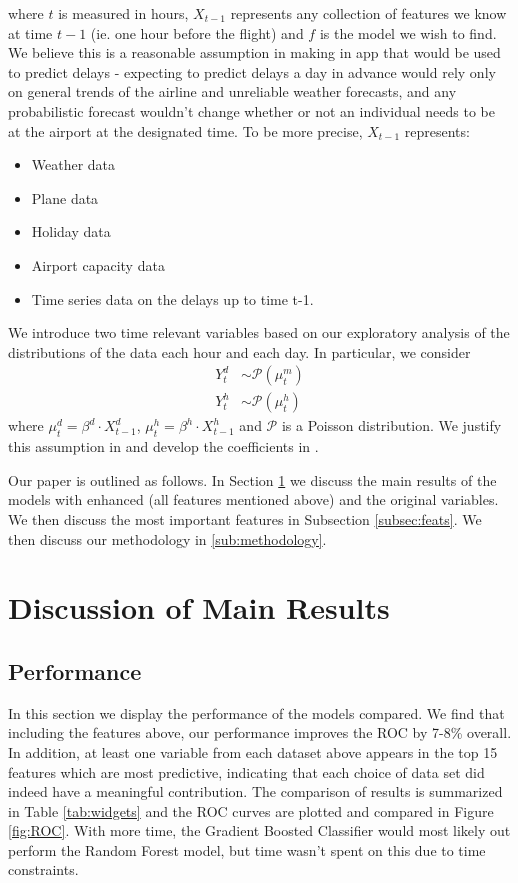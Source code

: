 \documentclass[twocolumn,showpacs,%
  nofootinbib,aps,superscriptaddress,%
  eqsecnum,prd,notitlepage,showkeys,10pt]{revtex4-1}
\begin{document}
where $t$ is measured in hours, $X_{t-1}$ represents any collection of features we know at time $t-1$ (ie. one hour before the flight) and $f$ is the model we wish to find. 
We believe this is a reasonable assumption in making
in app that would be used to predict delays - expecting to predict delays a day in advance would rely only on general trends of the airline and unreliable weather forecasts, and any probabilistic forecast wouldn't change whether or not an individual needs to be at the airport at the designated time. To be more precise, $X_{t-1}$ represents:
\begin{itemize}
\item Weather data \cite{weather}
\item Plane data \cite{aviation}
\item Holiday data 
\item Airport capacity data \cite{boarding}
\item Time series data on the delays up to time t-1. \cite{airline2}
\end{itemize}
We introduce two time relevant variables based on our exploratory analysis of the distributions of the data each hour and each day. In particular, we consider 
\begin{align} Y_t^{d} &\sim \mathcal{P}(\mu_t^m)\\
Y_t^{h} &\sim \mathcal{P}(\mu_t^h)
\end{align}
where $\mu_t^d = \beta^d \cdot X_{t-1}^d$, $\mu_t^h= \beta^h \cdot X_{t-1}^h$ and $\mathcal{P}$ is a Poisson distribution. We justify this assumption in \cite{airline1} and develop the coefficients in \cite{airline2}.

Our paper is outlined as follows. In Section \ref{sec:main} we discuss the main results of the models with enhanced (all features mentioned above)  and the original variables. We then discuss
the most important features in Subsection \ref{subsec:feats}. We then discuss our methodology in \ref{sub:methodology}.

\section{Discussion of Main Results}
\label{sec:main}

\subsection{Performance}


In this section we display the performance of the models compared. We find that including the features above, our performance improves the ROC by 7-8\% overall. In addition, at least one variable from each dataset above appears in the top 15
features which are most predictive, indicating that each choice of data set did indeed have a meaningful contribution. The comparison of results is summarized in Table \ref{tab:widgets} and the ROC curves are plotted and compared in Figure \ref{fig:ROC}. With more time, the Gradient Boosted Classifier would most likely out perform the Random Forest model, but time wasn't spent on this due to time constraints. 
\end{document}
